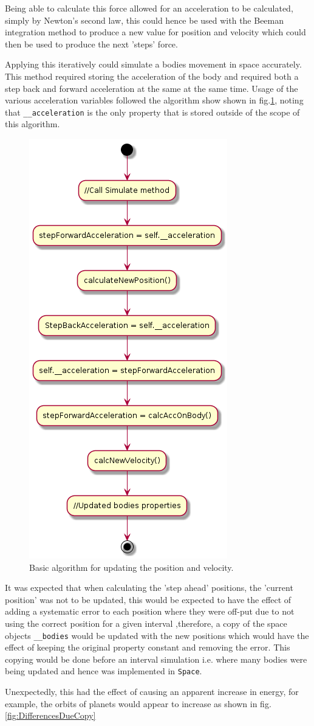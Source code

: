 \documentclass{article}
\begin{document}
                \par 
                Being able to calculate this force allowed for an acceleration to be calculated, 
                simply by Newton's second law, this could hence be used with the Beeman integration 
                method to produce a new value for position and velocity which could then be used to 
                produce the next 'steps' force. 
                \par
                Applying this iteratively could simulate a bodies movement in space accurately. This 
                method required storing the acceleration of the body and required both a step back
                and forward acceleration at the same at the same time. 
                Usage of the various acceleration variables followed the algorithm show shown in 
                fig.\ref{fig:AccAlgorithm}, noting that \verb|__acceleration| is the only 
                property that is stored outside of the scope of this algorithm.
                \begin{figure}[!ht]
                    \centering
                    \includegraphics[width = 0.3\linewidth]{Figures/AccelerationAlgorithm.png}
                    \caption{Basic algorithm for updating the position and velocity.}
                    \label{fig:AccAlgorithm}
                \end{figure} 
                \par 
                \pagebreak
                It was expected that when calculating the 'step ahead' positions, the 'current
                position' was not to be updated, this would be expected to  have the effect of 
                adding a systematic error to each position where they were off-put due to not using 
                the correct position for a given interval ,therefore, a copy of the space objects
                \verb|__bodies| would be updated with the new positions which would have the effect
                of keeping the original property constant and removing the error. This copying would
                be done before an interval simulation i.e. where many bodies were being updated and
                hence was implemented in \verb|Space|.
                \par
                Unexpectedly, this had the effect of causing an apparent increase in energy, for 
                example, the orbits of planets would appear to increase as shown in fig.\ref{fig:DifferencesDueCopy}
                
\end{document}
